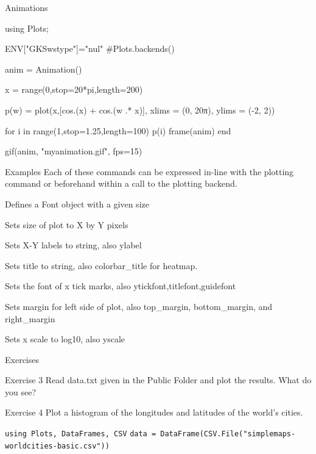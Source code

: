 \documentclass{beamer}
\newenvironment{Boxx}{\begin{tcolorbox}[standard jigsaw, opacityframe=0.8, opacityback=0.0,left=2pt,right=2pt,top=0pt,bottom=0pt]}{\end{tcolorbox}}
\begin{document}
\begin{frame}[fragile]{Animations}

		\begin{Boxx}
		\begin{jllisting}

	using Plots;
	
	ENV["GKSwstype"]="nul"	#Plots.backends()
	
	anim = Animation()
	
	x = range(0,stop=20*pi,length=200)
	
	p(w) = plot(x,[cos.(x) + cos.(w .* x)], xlims = (0, 20π), ylims = (-2, 2))
	
	for i in range(1,stop=1.25,length=100)
		p(i)
		frame(anim)
	end
	
	gif(anim, "myanimation.gif", fps=15)

			\end{jllisting}
		\end{Boxx}		

\end{frame}



\begin{frame}[fragile]{Examples}
Each of these commands can be expressed in-line with the plotting command or beforehand within a call to the plotting backend.
\begin{description}[leftmargin=*,align=right]
	\item[font(fontname,size)] Defines a Font object with a given size
	\item[size=(X,Y)] Sets size of plot to X by Y pixels
	\item[xlabel=string] Sets X-Y labels to string, also ylabel
	\item[title=string] Sets title to string, also colorbar\_title for heatmap.
	\item[xtickfont=font] Sets the font of x tick marks, also ytickfont,titlefont,guidefont
	\item[left\_margin=length] Sets margin for left side of plot, also top\_margin, bottom\_margin, and right\_margin
	\item[xscale=:log10] Sets x scale to log10, also yscale
\end{description}

\end{frame}


\begin{frame}[fragile]{Exercises}
	\begin{block}{Exercise 3}
		Read data.txt given in the Public Folder and plot the results.
		What do you see?
	\end{block}
	\begin{block}{Exercise 4}
		Plot a histogram of the longitudes and latitudes of the world's cities. 
		{\color{red}\footnotesize 
		
		\verb|using Plots, DataFrames, CSV|
		\verb|data = DataFrame(CSV.File("simplemaps-worldcities-basic.csv"))|
		}
\end{block}

\end{frame}
\end{document}
